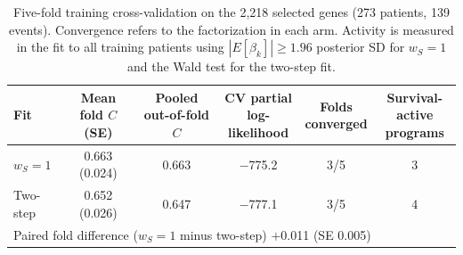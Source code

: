 \begin{table}[!htb]
\centering
\small
\begin{tabular}{lccccc}
\toprule
Fit & \shortstack{Mean fold $C$\\(SE)} & \shortstack{Pooled\\out-of-fold $C$} & \shortstack{CV partial\\log-likelihood} & \shortstack{Folds\\converged} & \shortstack{Survival-active\\programs} \\
\midrule
$w_S = 1$ & 0.663 (0.024) & 0.663 & $-$775.2 & 3/5 & 3 \\
Two-step & 0.652 (0.026) & 0.647 & $-$777.1 & 3/5 & 4 \\
\midrule
\multicolumn{6}{l}{Paired fold difference ($w_S = 1$ minus two-step) \quad $+$0.011 (SE 0.005)} \\
\bottomrule
\end{tabular}
\caption{Five-fold training cross-validation on the 2,218 selected genes (273 patients, 139 events). Convergence refers to the factorization in each arm. Activity is measured in the fit to all training patients using $|E[\beta_k]| \geq 1.96$ posterior SD for $w_S = 1$ and the Wald test for the two-step fit.}
\label{tab:training-cv}
\end{table}
